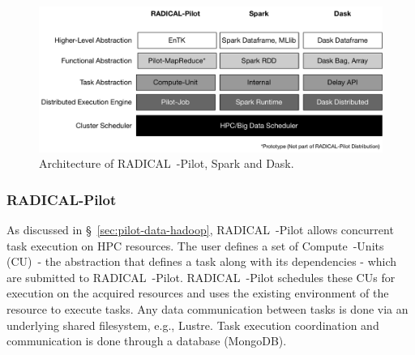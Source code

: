 \begin{figure}[ht]
    \centering
    \includegraphics[width=.95\textwidth]{figures/data_analytics_hpc/task_par/bigdata_framework_stack.pdf}
    \caption{Architecture of RADICAL~-Pilot, Spark and Dask.}
    \label{fig:figures_bigdata_framework_stack}
\end{figure}

\subsubsection*{RADICAL-Pilot}

As discussed in \S~\ref{sec:pilot-data-hadoop}, RADICAL~-Pilot allows concurrent task execution on HPC resources.
The user defines a set of Compute~-Units (CU)~- the abstraction that defines a task along with its dependencies - which are submitted to RADICAL~-Pilot.
RADICAL~-Pilot schedules these CUs for execution on the acquired resources and uses the existing environment of the resource to execute tasks.
Any data communication between tasks is done via an underlying shared filesystem, e.g., Lustre.
Task execution coordination and communication is done through a database (MongoDB).

